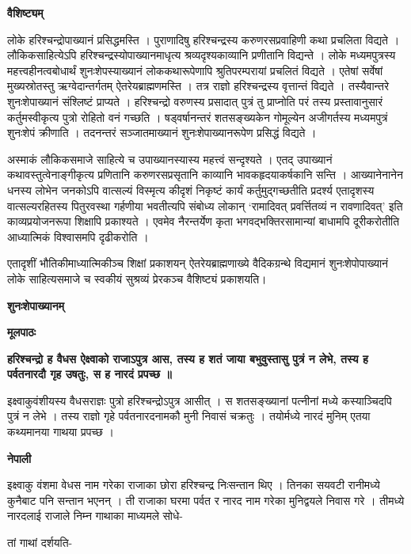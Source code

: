 \documentclass[11pt, a5paper]{article}
\begin{document}
\textbf{वैशिष्ट्यम्}

लोके हरिश्चन्द्रोपाख्यानं प्रसिद्धमस्ति । पुराणादिषु हरिश्चन्द्रस्य करुणरसप्रवाहिणी कथा प्रचलिता विद्यते । लौकिकसाहित्येऽपि हरिश्चन्द्रस्योपाख्यानमाधृत्य श्रव्यदृश्यकाव्यानि प्रणीतानि विद्यन्ते । लोके मध्यमपुत्रस्य महत्त्वहीनत्वबोधार्थं शुनःशेपस्याख्यानं लोककथारूपेणापि श्रुतिपरम्परायां प्रचलितं विद्यते । एतेषां सर्वेषां मुख्यस्रोतस्तु ऋग्वेदान्तर्गतम् ऐतरेयब्राह्मणमस्ति । तत्र राज्ञो हरिश्चन्द्रस्य वृत्तान्तं विद्यते । तस्यैवान्तरे शुनःशेपाख्यानं संश्लिष्टं प्राप्यते । हरिश्चन्द्रो वरुणस्य प्रसादात् पुत्रं तु प्राप्नोति परं तस्य प्रस्तावानुसारं कर्तुमस्वीकृत्य पुत्रो रोहितो वनं गच्छति । षड्‌वर्षानन्तरं शतसङ्‌ख्यकेन गोमूल्येन अजीगर्तस्य मध्यमपुत्रं शुनःशेपं क्रीणाति । तदनन्तरं सञ्जातमाख्यानं शुनःशेपाख्यानरूपेण प्रसिद्धं विद्यते ।

अस्माकं लौकिकसमाजे साहित्ये च उपाख्यानस्यास्य महत्त्वं सन्दृश्यते । एतद् उपाख्यानं कथावस्तुत्वेनाङ्‌गीकृत्य प्रणितानि करुणरसप्रसृतानि काव्यानि भावकहृदयाकर्षकानि सन्ति । आख्यानेनानेन धनस्य लोभेन जनकोऽपि वात्सल्यं विस्मृत्य कीदृशं निकृष्टं कार्यं कर्तुमुद्गच्छतीति प्रदर्श्य एतादृशस्य वात्सल्यरहितस्य पितुरवस्था गर्हणीया भवतीत्यपि संबोध्य लोकान् ‘रामादिवत् प्रवर्त्तितव्यं न रावणादिवत्’ इति काव्यप्रयोजनरूपा शिक्षापि प्रकाश्यते । एवमेव नैरन्तर्येण कृता भगवद्भक्तिरसामान्यां बाधामपि दूरीकरोतीति आध्यात्मिकं विश्वासमपि दृढीकरोति ।

एतादृशीं भौतिकीमाध्यात्मिकीञ्च शिक्षां प्रकाशयन् ऐतरेयब्राह्मणाख्ये वैदिकग्रन्थे विद्यमानं शुनःशेपोपाख्यानं लोके साहित्यसमाजे च स्वकीयं सुश्रव्यं प्रेरकञ्च वैशिष्ट्यं प्रकाशयति।

\textbf{शुनःशेपाख्यानम्}

\textbf{मूलपाठः}

\textbf{हरिश्चन्द्रो ह वैधस ऐक्ष्वाको राजाऽपुत्र आस, तस्य ह शतं जाया बभुवुस्तासु पुत्रं न लेभे, तस्य ह पर्वतनारदौ गृह उषतुः, स ह नारदं प्रपच्छ ॥}

इक्ष्वाकुवंशीयस्य वैधसराज्ञः पुत्रो हरिश्चन्द्रोऽपुत्र आसीत् । स शतसङ्‌ख्यानां पत्नीनां मध्ये कस्याञ्चिदपि पुत्रं न लेभे । तस्य राज्ञो गृहे पर्वतनारदनामकौ मुनी निवासं चक्रतुः । तयोर्मध्ये नारदं मुनिम् एतया कथ्यमानया गाथया प्रपच्छ ।

\textbf{नेपाली}

इक्ष्वाकु वंशमा वेधस नाम गरेका राजाका छोरा हरिश्चन्द्र निःसन्तान थिए । तिनका सयवटी रानीमध्ये कुनैबाट पनि सन्तान भएनन् । ती राजाका घरमा पर्वत र नारद नाम गरेका मुनिद्वयले निवास गरे । तीमध्ये नारदलाई राजाले निम्न गाथाका माध्यमले सोधे-

तां गाथां दर्शयति-
\end{document}
